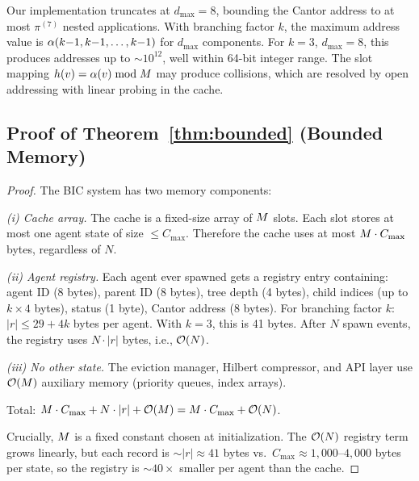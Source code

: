 \begin{remark}
Our implementation truncates at $d_{\max} = 8$, bounding the Cantor
address to at most $\pi^{(7)}$ nested applications.  With branching
factor $k$, the maximum address value is $\alpha(k{-}1, k{-}1, \dots, k{-}1)$
for $d_{\max}$ components.  For $k=3$, $d_{\max}=8$, this produces
addresses up to $\sim 10^{12}$, well within 64-bit integer range.
The slot mapping $h(v) = \alpha(v) \bmod M$ may produce
collisions, which are resolved by open addressing with linear probing
in the cache.
\end{remark}


\subsection{Proof of Theorem~\ref{thm:bounded} (Bounded Memory)}
\label{sec:proof-bounded}

\begin{proof}
The BIC system has two memory components:

\emph{(i) Cache array.}  The cache is a fixed-size array of $M$
slots.  Each slot stores at most one agent state of size
$\leq C_{\max}$.  Therefore the cache uses at most
$M \cdot C_{\max}$ bytes, regardless of $N$.

\emph{(ii) Agent registry.}  Each agent ever spawned gets a registry
entry containing: agent ID (8 bytes), parent ID (8 bytes), tree depth
(4 bytes), child indices (up to $k \times 4$ bytes), status (1 byte),
Cantor address (8 bytes).  For branching factor $k$:
$|r| \leq 29 + 4k$ bytes per agent.  With $k=3$, this is 41 bytes.
After $N$ spawn events, the registry uses $N \cdot |r|$ bytes, i.e.,
$\mathcal{O}(N)$.

\emph{(iii) No other state.}  The eviction manager, Hilbert compressor,
and API layer use $\mathcal{O}(M)$ auxiliary memory (priority queues,
index arrays).

Total: $M \cdot C_{\max} + N \cdot |r| + \mathcal{O}(M)
= M \cdot C_{\max} + \mathcal{O}(N)$.

Crucially, $M$ is a fixed constant chosen at initialization.
The $\mathcal{O}(N)$ registry term grows linearly, but each record is
$\sim$$|r| \approx 41$ bytes vs.\ $C_{\max} \approx 1{,}000$--$4{,}000$
bytes per state, so the registry is $\sim$$40\times$ smaller per agent
than the cache.
\end{proof}


